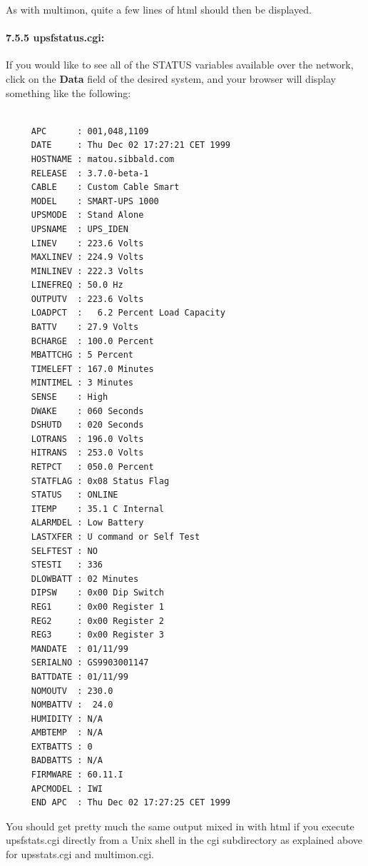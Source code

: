 {{{{{{{{\label{index-upssstats-130}
\label{index-CGI_002c-upssstats-131}
As with multimon, quite a few lines of html should then be displayed. 

\label{upsfstatus_005fcgi}

\paragraph*{7.5.5 upsfstatus.cgi:}

\label{index-upsfstatus-132}
\label{index-CGI_002c-upsfstatus-133}
If you would like to see all of the STATUS variables available over the
network, click on the {\bf Data} field of the desired system, and your browser
will display something like the following: 

\footnotesize
\begin{verbatim}
     
     APC      : 001,048,1109
     DATE     : Thu Dec 02 17:27:21 CET 1999
     HOSTNAME : matou.sibbald.com
     RELEASE  : 3.7.0-beta-1
     CABLE    : Custom Cable Smart
     MODEL    : SMART-UPS 1000
     UPSMODE  : Stand Alone
     UPSNAME  : UPS_IDEN
     LINEV    : 223.6 Volts
     MAXLINEV : 224.9 Volts
     MINLINEV : 222.3 Volts
     LINEFREQ : 50.0 Hz
     OUTPUTV  : 223.6 Volts
     LOADPCT  :   6.2 Percent Load Capacity
     BATTV    : 27.9 Volts
     BCHARGE  : 100.0 Percent
     MBATTCHG : 5 Percent
     TIMELEFT : 167.0 Minutes
     MINTIMEL : 3 Minutes
     SENSE    : High
     DWAKE    : 060 Seconds
     DSHUTD   : 020 Seconds
     LOTRANS  : 196.0 Volts
     HITRANS  : 253.0 Volts
     RETPCT   : 050.0 Percent
     STATFLAG : 0x08 Status Flag
     STATUS   : ONLINE
     ITEMP    : 35.1 C Internal
     ALARMDEL : Low Battery
     LASTXFER : U command or Self Test
     SELFTEST : NO
     STESTI   : 336
     DLOWBATT : 02 Minutes
     DIPSW    : 0x00 Dip Switch
     REG1     : 0x00 Register 1
     REG2     : 0x00 Register 2
     REG3     : 0x00 Register 3
     MANDATE  : 01/11/99
     SERIALNO : GS9903001147
     BATTDATE : 01/11/99
     NOMOUTV  : 230.0
     NOMBATTV :  24.0
     HUMIDITY : N/A
     AMBTEMP  : N/A
     EXTBATTS : 0
     BADBATTS : N/A
     FIRMWARE : 60.11.I
     APCMODEL : IWI
     END APC  : Thu Dec 02 17:27:25 CET 1999
\end{verbatim}
\normalsize

You should get pretty much the same output mixed in with html if you execute
upsfstats.cgi directly from a Unix shell in the cgi subdirectory as explained
above for upsstats.cgi and multimon.cgi. 

}}}}}}}}
